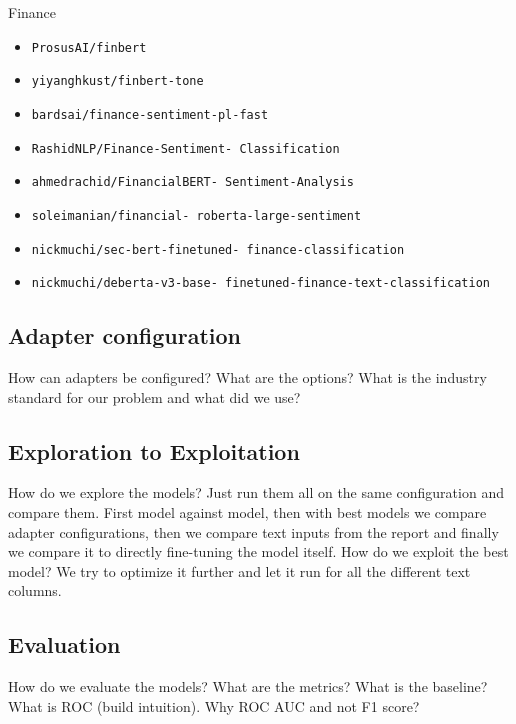\documentclass[conference]{IEEEtran}
\begin{document}
Finance
\begin{itemize}
\item \texttt{ProsusAI/finbert}
\item \texttt{yiyanghkust/finbert-tone}
\item \texttt{bardsai/finance-sentiment-pl-fast}
\item \texttt{RashidNLP/Finance-Sentiment- Classification}
\item \texttt{ahmedrachid/FinancialBERT- Sentiment-Analysis}
\item \texttt{soleimanian/financial- roberta-large-sentiment}
\item \texttt{nickmuchi/sec-bert-finetuned- finance-classification}
\item \texttt{nickmuchi/deberta-v3-base- finetuned-finance-text-classification}
\end{itemize}

\subsection{Adapter configuration}%
How can adapters be configured? What are the options? What is the industry standard for our problem and what did we use?
\subsection{Exploration to Exploitation}%
How do we explore the models? Just run them all on the same configuration and compare them.
First model against model, then with best models we compare adapter configurations, then we compare text inputs from the report and finally we compare it to directly fine-tuning the model itself.
How do we exploit the best model? We try to optimize it further and let it run for all the different text columns.
\subsection{Evaluation} %
How do we evaluate the models? What are the metrics? What is the baseline?
What is ROC (build intuition).
Why ROC AUC and not F1 score?
\end{document}
